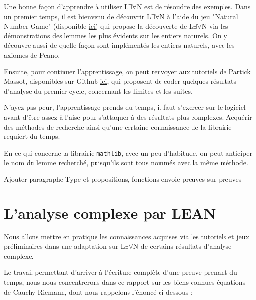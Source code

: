 \documentclass[a4paper, 11pt, twoside]{report}
\newcommand{\LEAN}{L$\exists\forall$N }
\begin{document}
\bigskip

Une bonne façon d'apprendre à utiliser \LEAN est de résoudre des exemples. Dans un premier temps, il est bienvenu de découvrir \LEAN à l'aide du jeu "Natural Number Game" (disponible \href{https://www.ma.imperial.ac.uk/~buzzard/xena/natural_number_game/}{ici}) qui propose la découverte de \LEAN via les démonstrations des lemmes les plus évidents sur les entiers naturels. On y découvre aussi de quelle façon sont implémentés les entiers naturels, avec les axiomes de Peano.

Ensuite, pour continuer l'apprentissage, on peut renvoyer aux tutoriels de Partick Massot, disponibles sur Github \href{https://github.com/leanprover-community/tutorials/tree/master/src/exercises}{ici}, qui proposent de coder quelques résultats d'analyse du premier cycle, concernant les limites et les suites.

\medskip

N'ayez pas peur, l'apprentissage prends du temps, il faut s'exercer sur le logiciel avant d'être assez à l'aise pour s'attaquer à des résultats plus complexes. Acquérir des méthodes de recherche ainsi qu'une certaine connaissance de la librairie requiert du temps. 

En ce qui concerne la librairie \verb|mathlib|, avec un peu d'habitude, on peut anticiper le nom du lemme recherché, puisqu'ils sont tous nommés avec la même méthode.

{\Huge Ajouter paragraphe Type et propositions, fonctions envoie preuves sur preuves}

\chapter{L'analyse complexe par LEAN}

Nous allons mettre en pratique les connaissances acquises via les tutoriels et jeux préliminaires dans une adaptation sur \LEAN de certains résultats d'analyse complexe. 

Le travail permettant d'arriver à l'écriture complète d'une preuve prenant du temps, nous nous concentrerons dans ce rapport sur les biens connues équations de Cauchy-Riemann, dont nous rappelons l'énoncé ci-dessous :
\end{document}

